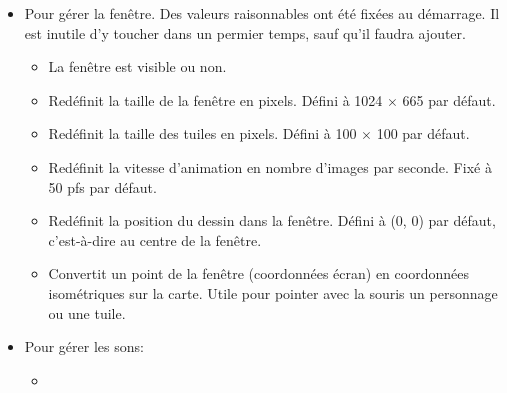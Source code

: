 \documentclass[11pt]{article}
\begin{document}
\begin{itemize}
\begin{itemize}
    \end{itemize}

    \item Pour gérer la fenêtre. Des valeurs raisonnables ont été fixées au démarrage. Il est inutile d'y toucher dans un permier temps, sauf 
     qu'il faudra ajouter.
     
    \begin{itemize}
        \item {}
        
        La fenêtre est visible ou non.

        \item {}

        Redéfinit la taille de la fenêtre en pixels. Défini à 1024 $\times$ 665 par défaut.

        \item {}
        
        Redéfinit la taille des tuiles en pixels. Défini à 100 $\times$ 100 par défaut.

        \item {}
        
            Redéfinit la vitesse d'animation en nombre d'images par seconde. Fixé à 50 pfs par défaut.

        \item {}
        
            Redéfinit la position du dessin dans la fenêtre. Défini à (0, 0) par défaut, c'est-à-dire au centre de la fenêtre.

        \item {}
        

            Convertit un point de la fenêtre (coordonnées écran) en coordonnées isométriques sur la carte.
            Utile pour pointer avec la souris un personnage ou une tuile.

    \end{itemize}

    \item Pour gérer les sons:
    \begin{itemize}

    \item {}
    

\end{itemize}
\end{itemize}
\end{document}
